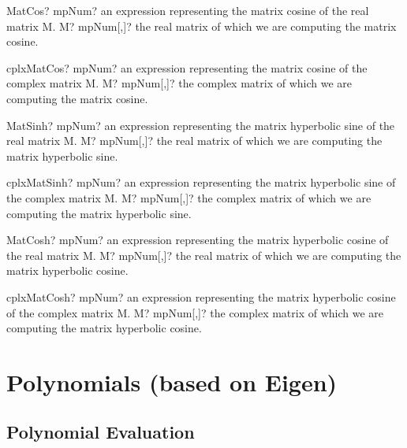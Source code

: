 \documentclass[12pt,a4paper,openany]{book}
\begin{document}
\begin{mpFunctionsExtract}
\mpFunctionOne
{MatCos? mpNum? an expression representing the matrix cosine of the real matrix M.}
{M? mpNum[,]? the real matrix of which we are computing the matrix cosine.}
\end{mpFunctionsExtract}

\begin{mpFunctionsExtract}
\mpFunctionOne
{cplxMatCos? mpNum? an expression representing the matrix cosine of the complex matrix M.}
{M? mpNum[,]? the complex matrix of which we are computing the matrix cosine.}
\end{mpFunctionsExtract}

\begin{mpFunctionsExtract}
\mpFunctionOne
{MatSinh? mpNum? an expression representing the matrix hyperbolic sine of the real matrix M.}
{M? mpNum[,]? the real matrix of which we are computing the matrix hyperbolic sine.}
\end{mpFunctionsExtract}

\begin{mpFunctionsExtract}
\mpFunctionOne
{cplxMatSinh? mpNum? an expression representing the matrix hyperbolic sine of the complex matrix M.}
{M? mpNum[,]? the complex matrix of which we are computing the matrix hyperbolic sine.}
\end{mpFunctionsExtract}

\begin{mpFunctionsExtract}
\mpFunctionOne
{MatCosh? mpNum? an expression representing the matrix hyperbolic cosine of the real matrix M.}
{M? mpNum[,]? the real matrix of which we are computing the matrix hyperbolic cosine.}
\end{mpFunctionsExtract}

\begin{mpFunctionsExtract}
\mpFunctionOne
{cplxMatCosh? mpNum? an expression representing the matrix hyperbolic cosine of the complex matrix M.}
{M? mpNum[,]? the complex matrix of which we are computing the matrix hyperbolic cosine.}
\end{mpFunctionsExtract}

\chapter{Polynomials (based on Eigen)}

\section{Polynomial Evaluation}
\end{document}
